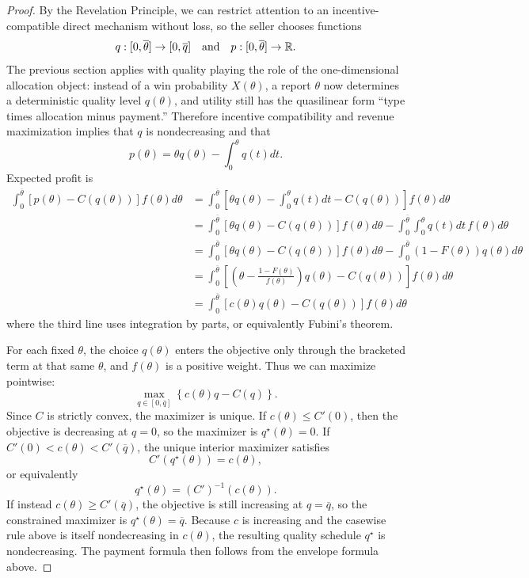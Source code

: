 \begin{proof}
	By the Revelation Principle, we can restrict attention to an incentive-compatible direct mechanism without loss, so the seller chooses functions
	\[
		q: [0,\overline{\theta}] \to [0,\overline{q}]
		\quad \text{and} \quad
		p: [0,\overline{\theta}] \to \mathbb{R}
	.\] 
	The previous section applies with quality playing the role of the one-dimensional allocation object: instead of a win probability $X(\theta)$, a report $\theta$ now determines a deterministic quality level $q(\theta)$, and utility still has the quasilinear form ``type times allocation minus payment.'' Therefore incentive compatibility and revenue maximization implies that $q$ is nondecreasing and that
	\[
		p(\theta) = \theta q(\theta) - \int_{0}^{\theta} q(t)dt 
	.\]
	Expected profit is
	\begin{align*}
		\int_{0}^{\overline{\theta}} \left[ p(\theta) - C(q(\theta)) \right]f(\theta)d\theta
		&= \int_{0}^{\overline{\theta}} \left[ \theta q(\theta) - \int_{0}^{\theta} q(t)dt - C(q(\theta)) \right]f(\theta)d\theta \\
		&= \int_{0}^{\overline{\theta}} \left[ \theta q(\theta) - C(q(\theta)) \right]f(\theta)d\theta - \int_{0}^{\overline{\theta}} \int_{0}^{\theta} q(t)dt\, f(\theta)d\theta \\
		&= \int_{0}^{\overline{\theta}} \left[ \theta q(\theta) - C(q(\theta)) \right]f(\theta)d\theta - \int_{0}^{\overline{\theta}} \left( 1-F(\theta) \right) q(\theta)d\theta \\
		&= \int_{0}^{\overline{\theta}} \left[ \left( \theta - \frac{1-F(\theta)}{f(\theta)} \right)q(\theta) - C(q(\theta)) \right]f(\theta)d\theta \\
		&= \int_{0}^{\overline{\theta}} \left[ c(\theta)q(\theta) - C(q(\theta)) \right]f(\theta)d\theta
	\end{align*} 
	where the third line uses integration by parts, or equivalently Fubini's theorem.

	For each fixed $\theta$, the choice $q(\theta)$ enters the objective only through the bracketed term at that same $\theta$, and $f(\theta)$ is a positive weight. Thus we can maximize pointwise:
	\[
		\max_{q \in [0,\overline{q}]} \left\{ c(\theta)q - C(q) \right\}.
	\]
	Since $C$ is strictly convex, the maximizer is unique. If $c(\theta) \le C'(0)$, then the objective is decreasing at $q=0$, so the maximizer is $q^\star(\theta)=0$. If $C'(0) < c(\theta) < C'(\overline{q})$, the unique interior maximizer satisfies
	\[
		C'(q^\star(\theta)) = c(\theta),
	\]
	or equivalently
	\[
		q^\star(\theta) = \left(C'\right)^{-1}\left( c(\theta) \right).
	\]
	If instead $c(\theta) \ge C'(\overline{q})$, the objective is still increasing at $q=\overline{q}$, so the constrained maximizer is $q^\star(\theta)=\overline{q}$.
	Because $c$ is increasing and the casewise rule above is itself nondecreasing in $c(\theta)$, the resulting quality schedule $q^\star$ is nondecreasing. The payment formula then follows from the envelope formula above.
\end{proof}

